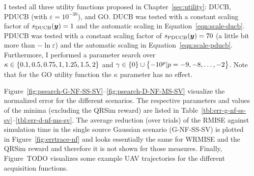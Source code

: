 I tested all three utility functions proposed in Chapter~\ref{sec:utility}: 
DUCB, PDUCB (with $\varepsilon = 10^{-30}$), and GO\@. DUCB was tested with 
a constant scaling factor of $s_{\mathrm{DUCB}}(\bm{y}) = 1$ and the automatic scaling 
in Equation~\ref{eqn:scale-ducb}.  PDUCB was tested with a constant scaling 
factor of $s_{\mathrm{PDUCB}}(\bm{y}) = 70$ (a little bit more than $-\ln \varepsilon$) 
and the automatic scaling in Equation~\ref{eqn:scale-pducb}.  Furthermore, 
I performed a parameter search over $\kappa \in \cbr{0.1, 0.5, 
0.75, 1, 1.25, 1.5, 2}$ and $\gamma \in \cbr{0} \cup \cbr{-10^p | p = -9, -8, 
  \dots, -2}$. Note that for the GO utility function the $\kappa$ parameter has 
no effect.

Figure~\ref{fig:psearch-G-NF-SS-SV}--\ref{fig:psearch-D-NF-MS-SV} visualize the 
normalized error for the different scenarios.  The respective parameters and 
values of the minima (excluding the QRSim reward) are listed in 
Table~\ref{tbl:err-g-nf-ss-sv}--\ref{tbl:err-d-nf-ms-sv}.  The average reduction 
(over trials) of the RMISE against simulation time in the single source Gaussian 
scenario (G-NF-SS-SV) is plotted in Figure~\ref{fig:errtrace-nf} and looks 
essentially the same for WRMISE and the QRSim reward and therefore it is not 
shown fer those measures. Finally, Figure~TODO visualizes some example UAV 
trajectories for the different acquisition functions.

